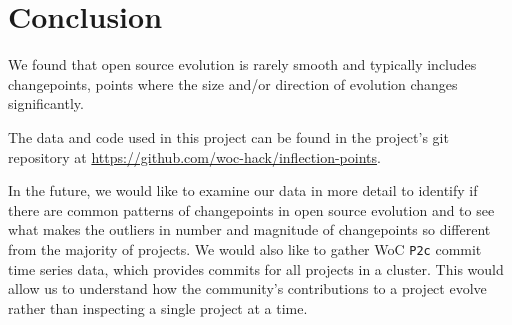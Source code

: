 \documentclass[10pt,conference]{IEEEtran}
\begin{document}
\section{Conclusion}

We found that open source evolution is rarely smooth and typically includes changepoints, points where the size and/or direction of evolution changes significantly. 

The data and code used in this project can be found in the project's git repository at \url{https://github.com/woc-hack/inflection-points}.

In the future, we would like to examine our data in more detail to identify if there are common patterns of changepoints in open source evolution and to see what makes the outliers in number and magnitude of changepoints so different from the majority of projects. We would also like to gather WoC \texttt{P2c} commit time series data, which provides commits for all projects in a cluster. This would allow us to understand how the community’s contributions to a project evolve rather than inspecting a single project at a time.




\end{document}
